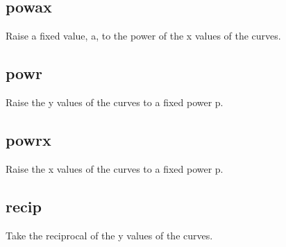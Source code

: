 \documentclass[letterpaper,10pt,english]{sphinxmanual}
\begin{document}
\subsection{powax}
\label{\detokenize{math_operations:powax}}
Raise a fixed value, a, to the power of the x values of the curves.

\begin{sphinxVerbatim}[commandchars=\\\{\}]
\PYG{p}{[}\PYG{p}{]}   
\end{sphinxVerbatim}


\subsection{powr}
\label{\detokenize{math_operations:powr}}
Raise the y values of the curves to a fixed power p.

\begin{sphinxVerbatim}[commandchars=\\\{\}]
\PYG{p}{[}\PYG{p}{]}   
\end{sphinxVerbatim}


\subsection{powrx}
\label{\detokenize{math_operations:powrx}}
Raise the x values of the curves to a fixed power p.

\begin{sphinxVerbatim}[commandchars=\\\{\}]
\PYG{p}{[}\PYG{p}{]}   
\end{sphinxVerbatim}


\subsection{recip}
\label{\detokenize{math_operations:recip}}
Take the reciprocal of the y values of the curves.

\begin{sphinxVerbatim}[commandchars=\\\{\}]
\PYG{p}{[}\PYG{p}{]}  
\end{sphinxVerbatim}
\end{document}
